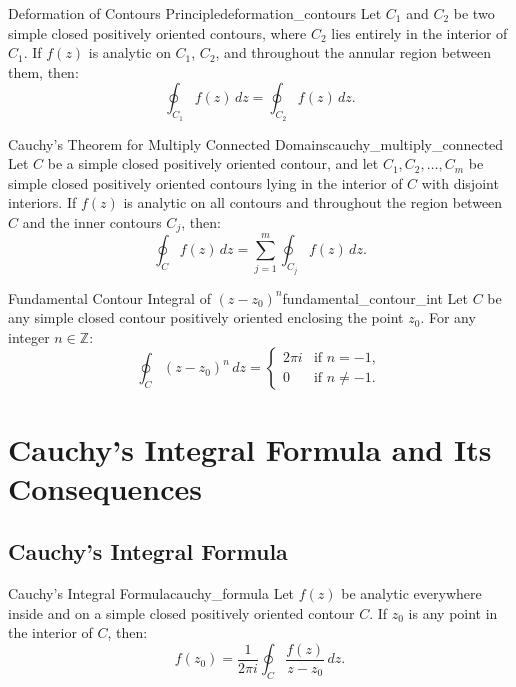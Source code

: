 \begin{theorem}{Deformation of Contours Principle}{deformation_contours}
Let $C_1$ and $C_2$ be two simple closed positively oriented contours, where $C_2$ lies entirely in the interior of $C_1$.
If $f(z)$ is analytic on $C_1$, $C_2$, and throughout the annular region between them, then:
\begin{equation}
\oint_{C_1} f(z)\, dz = \oint_{C_2} f(z)\, dz.
\end{equation}
\end{theorem}

\begin{theorem}{Cauchy's Theorem for Multiply Connected Domains}{cauchy_multiply_connected}
Let $C$ be a simple closed positively oriented contour, and let $C_1, C_2, \dots, C_m$ be simple closed positively oriented contours lying in the interior of $C$ with disjoint interiors.
If $f(z)$ is analytic on all contours and throughout the region between $C$ and the inner contours $C_j$, then:
\begin{equation}
\oint_C f(z)\, dz = \sum_{j=1}^m \oint_{C_j} f(z)\, dz.
\end{equation}
\end{theorem}

\begin{proposition}{Fundamental Contour Integral of $(z - z_0)^n$}{fundamental_contour_int}
Let $C$ be any simple closed contour positively oriented enclosing the point $z_0$. For any integer $n \in \mathbb{Z}$:
\begin{equation}
\oint_C (z - z_0)^n\, dz = \begin{cases}
2\pi i & \text{if } n = -1, \\
0 & \text{if } n \neq -1.
\end{cases}
\end{equation}
\end{proposition}


\section{Cauchy's Integral Formula and Its Consequences}

\subsection{Cauchy's Integral Formula}

\begin{theorem}{Cauchy's Integral Formula}{cauchy_formula}
Let $f(z)$ be analytic everywhere inside and on a simple closed positively oriented contour $C$. If $z_0$ is any point in the interior of $C$, then:
\begin{equation}
f(z_0) = \frac{1}{2\pi i} \oint_C \frac{f(z)}{z - z_0}\, dz.
\end{equation}
\end{theorem}

